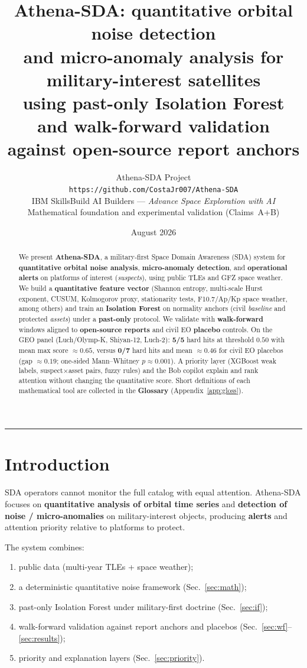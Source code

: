 \documentclass[11pt,a4paper]{article}
\title{\textbf{Athena-SDA:} quantitative orbital noise detection\\
and micro-anomaly analysis for military-interest satellites\\
using past-only Isolation Forest and walk-forward validation\\
against open-source report anchors}
\author{
  Athena-SDA Project\\
  \texttt{https://github.com/CostaJr007/Athena-SDA}\\
  \small IBM SkillsBuild AI Builders --- \textit{Advance Space Exploration with AI}\\
  \small Mathematical foundation and experimental validation (Claims~A+B)
}
\date{August 2026}
\begin{document}
\maketitle
\begin{abstract}
\noindent
We present \textbf{Athena-SDA}, a military-first Space Domain Awareness (SDA) system for \textbf{quantitative orbital noise analysis}, \textbf{micro-anomaly detection}, and \textbf{operational alerts} on platforms of interest (\textit{suspects}), using public TLEs and GFZ space weather.
We build a \textbf{quantitative feature vector} (Shannon entropy, multi-scale Hurst exponent, CUSUM, Kolmogorov proxy, stationarity tests, F10.7/Ap/Kp space weather, among others) and train an \textbf{Isolation Forest} on normality anchors (civil \textit{baseline} and protected \textit{assets}) under a \textbf{past-only} protocol.
We validate with \textbf{walk-forward} windows aligned to \textbf{open-source reports} and civil EO \textbf{placebo} controls.
On the GEO panel (Luch/Olymp-K, Shiyan-12, Luch-2): \textbf{5/5} hard hits at threshold $0.50$ with mean max score $\approx 0.65$, versus \textbf{0/7} hard hits and mean $\approx 0.46$ for civil EO placebos (gap $\approx 0.19$; one-sided Mann--Whitney $p\approx 0.001$).
A priority layer (XGBoost weak labels, suspect$\times$asset pairs, fuzzy rules) and the Bob copilot explain and rank attention without changing the quantitative score.
Short definitions of each mathematical tool are collected in the \textbf{Glossary} (Appendix~\ref{app:gloss}).
\end{abstract}

\tableofcontents
\vspace{0.8em}
\hrule
\vspace{1em}

\section{Introduction}
\label{sec:intro}

SDA operators cannot monitor the full catalog with equal attention.
Athena-SDA focuses on \textbf{quantitative analysis of orbital time series} and \textbf{detection of noise / micro-anomalies} on military-interest objects, producing \textbf{alerts} and attention priority relative to platforms to protect.

The system combines:
\begin{enumerate}[leftmargin=*]
  \item public data (multi-year TLEs + space weather);
  \item a deterministic quantitative noise framework (Sec.~\ref{sec:math});
  \item past-only Isolation Forest under military-first doctrine (Sec.~\ref{sec:if});
  \item walk-forward validation against report anchors and placebos (Sec.~\ref{sec:wf}--\ref{sec:results});
  \item priority and explanation layers (Sec.~\ref{sec:priority}).
\end{enumerate}
\end{document}
